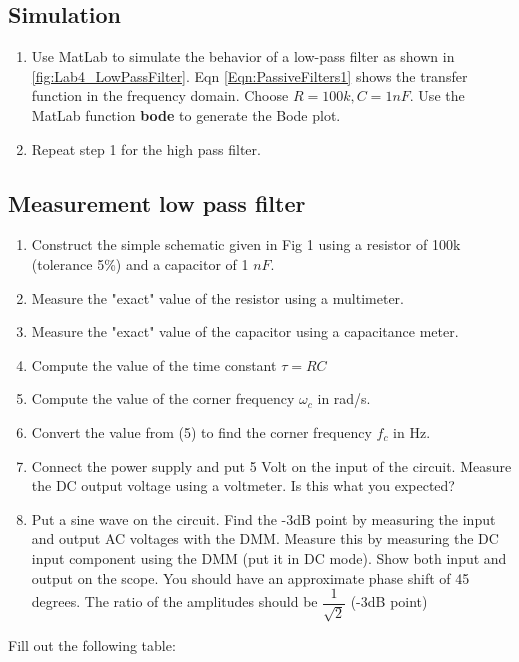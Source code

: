 \documentclass[11pt,letterpaper]{article}
\begin{document}
\subsection{Simulation}

\begin{enumerate}
\item Use MatLab to simulate the behavior of a low-pass filter as shown in \ref{fig:Lab4_LowPassFilter}. Eqn \ref{Eqn:PassiveFilters1} shows the transfer function in the frequency domain. Choose $R = 100k, C = 1 nF$. Use the MatLab function \textbf{bode} to generate the Bode plot.
\item Repeat step 1 for the high pass filter. 
\end{enumerate}

\subsection{Measurement low pass filter}

\begin{enumerate}
\item Construct the simple schematic given in Fig 1 using a resistor of 100k (tolerance 5\%) and a capacitor of 1 $nF$.
\item Measure the "exact" value of the resistor using a multimeter.
\item Measure the "exact" value of the capacitor using a capacitance meter.
\item Compute the value of the time constant $\tau = RC$
\item Compute the value of the corner frequency $\omega _c$ in rad/s.
\item Convert the value from (5) to find the corner frequency $f_c$ in Hz.
\item Connect the power supply and put 5 Volt on the input of the circuit. Measure the DC output voltage using a voltmeter. Is this what you expected? 
\item Put a sine wave on the circuit. Find the -3dB point by measuring the input and output AC voltages with the DMM. Measure this by measuring the DC input component using the DMM (put it in DC mode). Show both input and output on the scope. You should have an approximate phase shift of 45 degrees. The ratio of the amplitudes should be $\dfrac{1}{\sqrt{2}}$  (-3dB point)
\end{enumerate}

Fill out the following table:\\
\end{document}
